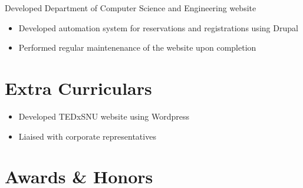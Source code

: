 \documentclass[11pt,a4paper,sans]{moderncv}        %
\begin{document}
{Developed Department of Computer Science and Engineering website
  \begin{itemize}%
    \item Developed automation system for reservations and registrations using Drupal
    \item Performed regular maintenenance of the website upon completion
\end{itemize}}

\section{Extra Curriculars}
{\begin{itemize}%
    \item Developed TEDxSNU website using Wordpress
    \item Liaised with corporate representatives
\end{itemize}}

\section{Awards \& Honors}

%


\clearpage
\end{document}
